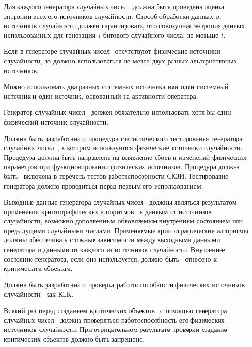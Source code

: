 \label{R.RN.Entropy}
Для каждого генератора случайных чисел~
должна быть проведена оценка энтропии всех его источников случайности. 
%
Способ обработки данных от источников случайности должен гарантировать, 
что совокупная энтропия данных, использованных для генерации~$l$-битового 
случайного числа, не меньше~$l$.

\label{R.RN.Source1}
Если в генераторе случайных чисел~ отсутствуют физические 
источники случайности, то должно использоваться не менее 
двух разных альтернативных источников.

\begin{note*}
Можно использовать два разных системных источника или один системный источник и 
один источник, основанный на активности оператора.
\end{note*}

\label{R.RN.Source2}
Генератор случайных чисел~ должен обязательно
использовать хотя бы один физический источник случайности.

\label{R.RN.Tests}
Должна быть разработана и 
процедура статистического тестирования генератора случайных 
чисел~, в котором используются физические источники 
случайности.
%
Процедура должна быть направлена на выявление сбоев и изменений физических
параметров при функционировании физических источников.
%
Процедура должна быть~ включена в перечень тестов 
работоспособности СКЗИ. Тестирование генератора должно проводиться перед 
первым его использованием. 

\label{R.RN.Crypto}
Выходные данные генератора случайных чисел~
должны являться результатом применения криптографических 
алгоритмов~ к данным от источников случайности, 
возможно дополненным обновляемым внутренним состоянием
или предыдущими случайными числами.
%
Применяемые криптографические алгоритмы должны 
обеспечивать сложные зависимости между выходными данными генератора и 
данными от каждого из источников случайности.
%
Внутреннее состояние генератора, если оно используется,
должно быть~ отнесено к критическим объектам.

\label{R.RN.TotTest}
%
Должна быть разработана и  проверка 
работоспособности физических источников случайности~ 
как КСК.

\label{R.RN.GenCrit}
Всякий раз перед созданием критических объектов~ 
с помощью генератора случайных чисел~ должна проверяться
работоспособность его физических источников случайности. 
%
При отрицательном результате проверки создание критических объектов должно быть 
запрещено.
